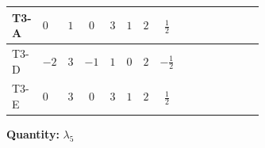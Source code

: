 \documentclass[8pt]{article}
\begin{document}
\begin{landscape}
\begin{longtable}{@{}llcccccc >{\raggedright\arraybackslash}p{0.21\linewidth} >{\raggedright\arraybackslash}p{0.21\linewidth} >{\raggedright\arraybackslash}p{0.21\linewidth}@{}}
\midrule
T3-A & $0$ & $1$ & $0$ & $3$ & $1$ & $2$ & $\frac{1}{2}$ & \scriptsize\adjustbox{max width=\linewidth}{$\begin{gathered} +2 {\lambda_1} {\lambda_5}\end{gathered}$} & \scriptsize\adjustbox{max width=\linewidth}{$\begin{gathered} +4 {\lambda_{HS_1}^{(1)}} {\lambda_5}\end{gathered}$} & \scriptsize\adjustbox{max width=\linewidth}{$\begin{gathered} +4 {\lambda_{HS_2}^{(1)}} {\lambda_5}\end{gathered}$} \\
\midrule
T3-D & $-2$ & $3$ & $-1$ & $1$ & $0$ & $2$ & $-\frac{1}{2}$ & \scriptsize\adjustbox{max width=\linewidth}{$\begin{gathered} +2 {\lambda_1} {\lambda_5}\end{gathered}$} & \scriptsize\adjustbox{max width=\linewidth}{$\begin{gathered} +4 {\lambda_{HS_1}^{(1)}} {\lambda_5}\end{gathered}$} & \scriptsize\adjustbox{max width=\linewidth}{$\begin{gathered} +4 {\lambda_{HS_2}^{(1)}} {\lambda_5}\end{gathered}$} \\
\midrule
T3-E & $0$ & $3$ & $0$ & $3$ & $1$ & $2$ & $\frac{1}{2}$ & \scriptsize\adjustbox{max width=\linewidth}{$\begin{gathered} +2 {\lambda_1} {\lambda_5}\end{gathered}$} & \scriptsize\adjustbox{max width=\linewidth}{$\begin{gathered} +4 {\lambda_{HS_1}^{(1)}} {\lambda_5}\end{gathered}$} & \scriptsize\adjustbox{max width=\linewidth}{$\begin{gathered} +4 {\lambda_{HS_2}^{(1)}} {\lambda_5}\end{gathered}$} \\
\midrule
\bottomrule
\end{longtable}
\clearpage
\noindent\textbf{Quantity: }$\lambda_5$\par\smallskip

\end{landscape}
\end{document}
